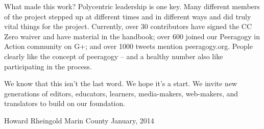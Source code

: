 What made this work? Polycentric leadership is one key. Many different
members of the project stepped up at different times and in different
ways and did truly vital things for the project. Currently, over 30
contributors have signed the CC Zero waiver and have material in the
handbook; over 600 joined our Peeragogy in Action community on G+; and
over 1000 tweets mention peeragogy.org. People clearly like the concept
of peeragogy -- and a healthy number also like participating in the
process.

We know that this isn't the last word. We hope it's a start. We invite
new generations of editors, educators, learners, media-makers,
web-makers, and translators to build on our foundation.

{Howard Rheingold Marin County January, 2014 }
